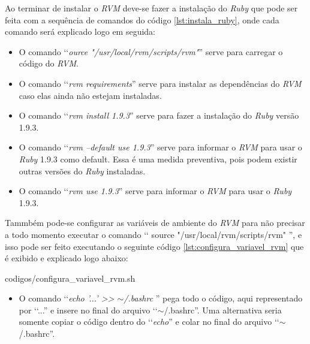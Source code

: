Ao terminar de instalar o \emph{RVM} deve-se fazer a instalação do \emph{Ruby} que pode ser feita com a
sequência de comandos do código \ref{lst:instala_ruby}, onde cada comando será
explicado logo em seguida:



\begin{itemize}

 \item O comando ‘‘\emph{ource "/usr/local/rvm/scripts/rvm"}'' serve para carregar o código do \emph{RVM}.

 \item O comando ‘‘\emph{rvm requirements}'' serve para instalar as dependências do \emph{RVM} caso elas
 ainda não estejam instaladas.

 \item O comando ‘‘\emph{rvm install 1.9.3}'' serve para fazer a instalação do \emph{Ruby} versão 1.9.3.

 \item O comando ‘‘\emph{rvm --default use 1.9.3}'' serve para informar o \emph{RVM} para usar o \emph{Ruby}
 1.9.3 como default. Essa é uma medida preventiva, pois podem existir outras versões do \emph{Ruby} instaladas.

 \item O comando ‘‘\emph{rvm use 1.9.3}'' serve para informar o \emph{RVM} para usar o \emph{Ruby} 1.9.3.

\end{itemize}


Tammbém pode-se configurar as variáveis de ambiente do \emph{RVM} para não precisar a todo momento executar
o comando ‘‘ source "/usr/local/rvm/scripts/rvm" '', e isso pode ser feito executando o seguinte código
\ref{lst:configura_variavel_rvm} que é exibido e explicado logo abaixo:


{codigos/configura_variavel_rvm.sh}

\begin{itemize}

  \item O comando ‘‘\emph{echo '...' >> $\sim$/.bashrc }'' pega todo o código, aqui representado por ‘‘...''
  e insere no final do arquivo ‘‘$\sim$/.bashrc''. Uma alternativa seria somente copiar o código dentro do
  ‘‘\emph{echo}'' e colar no final do arquivo ‘‘$\sim$/.bashrc''.

\end{itemize}


